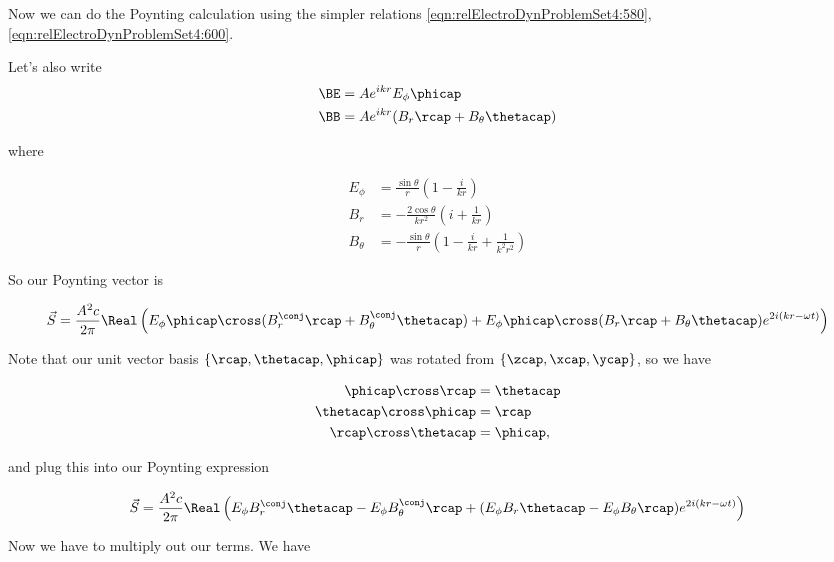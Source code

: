 Now we can do the Poynting calculation using the simpler relations \ref{eqn:relElectroDynProblemSet4:580}, \ref{eqn:relElectroDynProblemSet4:600}.

Let's also write
\begin{align}\label{eqn:relElectroDynProblemSet4:655}
\BE &= A e^{i k r} E_\phi \phicap \\
\BB &= A e^{i k r} ( B_r \rcap + B_\theta \thetacap )
\end{align}

where

\begin{align}\label{eqn:relElectroDynProblemSet4:660}
E_\phi &= \frac{\sin\theta}{r} \left( 1 - \frac{i}{kr} \right)  \\
B_r &= -\frac{2 \cos\theta}{k r^2} \left( i + \frac{1}{kr} \right)  \\
B_\theta &= - \frac{\sin\theta}{r} \left( 1 - \frac{i}{k r} + \frac{1}{k^2 r^2} \right) 
\end{align}

So our Poynting vector is

\begin{align*}
\vec{S} 
&= \frac{A^2 c}{2 \pi} \Real
\left(
E_\phi \phicap \cross ( B_r^\conj \rcap + B_\theta^\conj \thetacap )
+
E_\phi \phicap \cross ( B_r \rcap + B_\theta \thetacap ) e^{ 2 i ( k r - \omega t ) }
\right) \\
\end{align*}

Note that our unit vector basis $\{ \rcap, \thetacap, \phicap \}$ was rotated from $\{ \zcap, \xcap, \ycap \}$, so we have

\begin{align}\label{eqn:relElectroDynProblemSet4:670}
\phicap \cross \rcap &= \thetacap \\
\thetacap \cross \phicap &= \rcap \\
\rcap \cross \thetacap &= \phicap ,
\end{align}

and plug this into our Poynting expression

\begin{align*}
\vec{S} 
&= \frac{A^2 c}{2 \pi} \Real
\left(
E_\phi B_r^\conj \thetacap 
-E_\phi B_\theta^\conj \rcap 
+(E_\phi B_r \thetacap 
-E_\phi B_\theta \rcap )
e^{ 2 i ( k r - \omega t ) }
\right) \\
\end{align*}

Now we have to multiply out our terms.  We have

